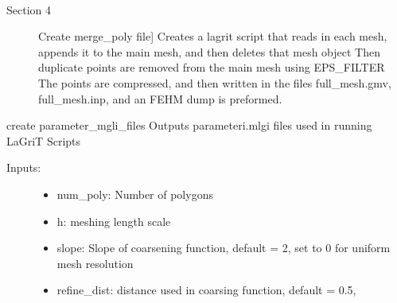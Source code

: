\documentclass[letterpaper,10pt,english]{sphinxmanual}
\begin{document}

\begin{fulllineitems}
\label{pydfnworks:pydfnworks.lagrit_scripts.create_merge_poly_files}~\begin{description}
\item[{Section 4}] \leavevmode{[}Create merge\_poly file{]}
Creates a lagrit script that reads in each mesh, appends it to the main mesh, and then deletes that mesh object
Then duplicate points are removed from the main mesh using EPS\_FILTER 
The points are compressed, and then written in the files full\_mesh.gmv, full\_mesh.inp, and an FEHM dump is preformed.

\end{description}

\end{fulllineitems}


\begin{fulllineitems}
\label{pydfnworks:pydfnworks.lagrit_scripts.create_parameter_mlgi_file}
create parameter\_mgli\_files
Outputs parameteri.mlgi files used in running LaGriT Scripts
\begin{description}
\item[{Inputs:}] \leavevmode\begin{itemize}
\item {} 
num\_poly: Number of polygons

\item {} 
h: meshing length scale

\item {} 
slope: Slope of coarsening function, default = 2, 
set to 0 for uniform mesh resolution

\item {} 
refine\_dist: distance used in coarsing function, default = 0.5,

\end{itemize}

\end{description}

\end{fulllineitems}
\end{document}
